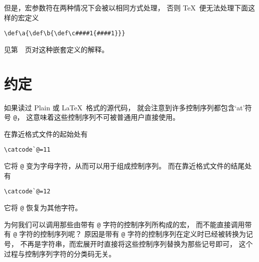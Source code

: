 \documentclass{book}
\begin{document}
但是，宏参数符在两种情况下会被以相同方式处理，
否则 \TeX\ 便无法处理下面这样的宏定义
\begin{verbatim}
\def\a{\def\b{\def\c####1{####1}}}
\end{verbatim}
见第~\pageref{nest:def}~页对这种嵌套定义的解释。

\section{ 约定}

如果读过 Plain 或 \LaTeX\ 格式的源代码，
就会注意到许多控制序列都包含`at'符号 \verb-@-，
这意味着这些控制序列不可被普通用户直接使用。

在靠近格式文件的起始处有
\begin{verbatim}
\catcode`@=11
\end{verbatim}
它将 \verb-@- 变为字母字符，从而可以用于组成控制序列。
而在靠近格式文件的结尾处有
\begin{verbatim}
\catcode`@=12
\end{verbatim}
它将 \verb-@- 恢复为其他字符。

为何我们可以调用那些由带有 \verb-@- 字符的控制序列所构成的宏，
而不能直接调用带有 \verb-@- 字符的控制序列呢？
原因是带有 \verb-@- 字符的控制序列在定义时已经被转换为记号，
不再是字符串，而宏展开时直接将这些控制序列替换为那些记号即可，
这个过程与控制序列字符的分类码无关。

\end{document}

